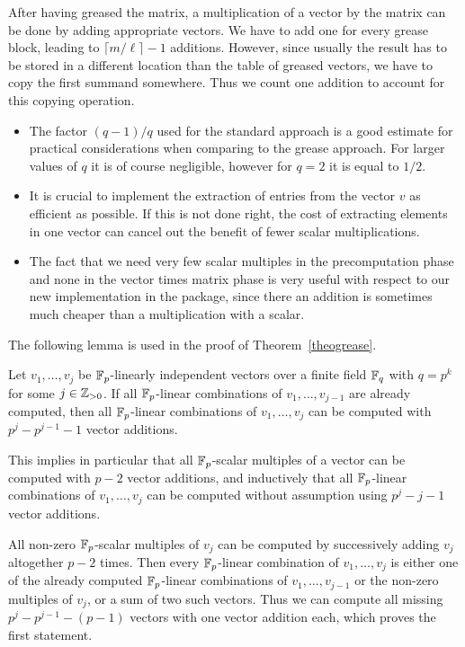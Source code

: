 After having greased the matrix, a multiplication of a vector by 
the matrix can be done by adding appropriate vectors. We have to add
one for every grease block, leading to $\lceil m/\ell \rceil - 1$ additions.
However, since usually the result has to be stored in a different location
than the table of greased vectors, we have to copy the first summand
somewhere. Thus we count one addition to account for this copying operation.
\ProofEnd

\begin{Rems}
\begin{itemize}
\item The factor $(q-1)/q$ used for the standard approach is a
good estimate for practical considerations when comparing to
the grease approach. For larger values of $q$ it is of course negligible,
however for $q=2$ it is equal to $1/2$.
\item It is crucial to implement the extraction of entries
from the vector $v$ as efficient as possible. If this is not done
right, the cost of extracting elements in one vector can cancel out
the benefit of fewer scalar multiplications.
\item The fact that we need very few scalar multiples in the
precomputation phase and none in the vector times matrix phase is
very useful with respect to our new implementation in the
{\cvec} package, since there an addition is sometimes much cheaper
than a multiplication with a scalar.
\end{itemize}
\end{Rems}
 
The following lemma is used in the proof of Theorem~\ref{theogrease}.

\begin{Lemm}
\label{alllinkomb}
Let $v_1, \ldots, v_{j}$ be\/ $\mathbb{F}_p$-linearly  
independent vectors over a finite field\/ $\mathbb{F}_q$ with $q = p^k$
for some $j \in \mathbb{Z}_{> 0}$. If
all\/ $\mathbb{F}_p$-linear combinations of $v_1, \ldots, v_{j-1}$ are already
computed, then all\/ $\mathbb{F}_p$-linear combinations of $v_1, \ldots, v_j$ can
be computed with $p^j - p^{j-1} - 1$ vector additions.

This implies in particular that all\/ $\mathbb{F}_p$-scalar multiples of a vector
can be computed with $p-2$ vector additions, and inductively that
all\/ $\mathbb{F}_p$-linear combinations of $v_1, \ldots, v_j$ can be computed
without assumption using $p^j-j-1$ vector additions.
\end{Lemm}
\Proof All non-zero $\mathbb{F}_p$-scalar multiples of $v_j$ can be computed by
successively adding $v_j$ altogether $p-2$ times. Then every $\mathbb{F}_p$-linear
combination of $v_1, \ldots, v_j$ is either one of the already
computed $\mathbb{F}_p$-linear combinations of $v_1, \ldots, v_{j-1}$ or the
non-zero multiples of $v_j$, or a sum of two such vectors. Thus we 
can compute all missing $p^j - p^{j-1} - (p-1)$ vectors with one
vector addition each, which proves the first statement. 

